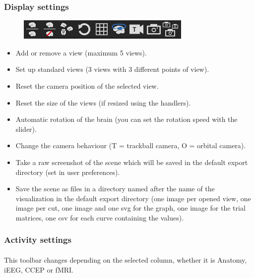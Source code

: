 \documentclass[a4paper]{article}
\begin{document}
\subsubsection{Display settings}
\begin{figure}[H]
\begin{center}
\includegraphics[scale=0.5]{DisplaySettings.png}
\end{center}
\end{figure}
\begin{itemize}
\item Add or remove a view (maximum 5 views).
\item Set up standard views (3 views with 3 different points of view).
\item Reset the camera position of the selected view.
\item Reset the size of the views (if resized using the handlers).
\item Automatic rotation of the brain (you can set the rotation speed with the slider).
\item Change the camera behaviour (T = trackball camera, O = orbital camera).
\item Take a raw screenshot of the scene which will be saved in the default export directory (set in user preferences).
\item Save the scene as files in a directory named after the name of the visualization in the default export directory (one image per opened view, one image per cut, one image and one svg for the graph, one image for the trial matrices, one csv for each curve containing the values).
\end{itemize}
\subsubsection{Activity settings}
\paragraph{} This toolbar changes depending on the selected column, whether it is Anatomy, iEEG, CCEP or fMRI.
\end{document}
